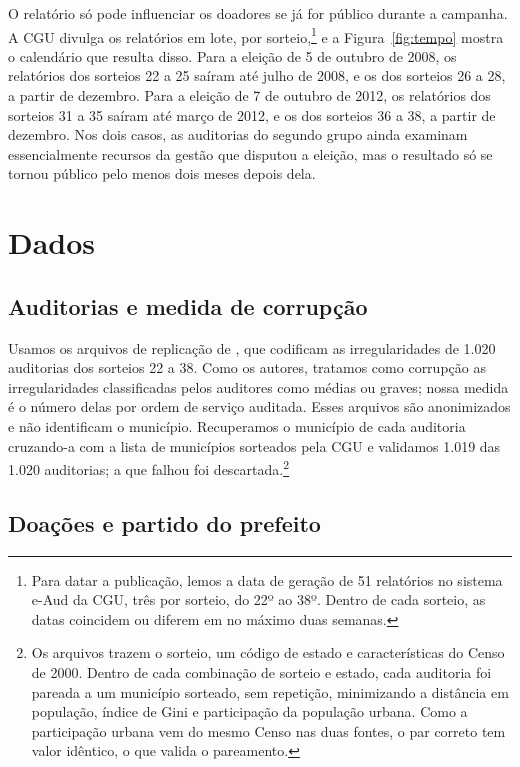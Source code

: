 O relatório só pode influenciar os doadores se já for público durante a campanha. A CGU divulga os
relatórios em lote, por sorteio,\footnote{Para datar a publicação, lemos a data de geração de 51 relatórios
no sistema e-Aud da CGU, três por sorteio, do 22º ao 38º. Dentro de cada sorteio, as datas coincidem ou
diferem em no máximo duas semanas.} e a Figura~\ref{fig:tempo} mostra o calendário que resulta disso. Para a eleição de 5 de outubro de
2008, os relatórios dos sorteios 22 a 25 saíram até julho de 2008, e os dos sorteios 26 a 28, a partir de
dezembro. Para a eleição de 7 de outubro de 2012, os relatórios dos sorteios 31 a 35 saíram até março de
2012, e os dos sorteios 36 a 38, a partir de dezembro. Nos dois casos, as auditorias do segundo grupo
ainda examinam essencialmente recursos da gestão que disputou a eleição, mas o resultado só se tornou
público pelo menos dois meses depois dela.


\FloatBarrier
\section{Dados}\label{sec:dados}

\subsection{Auditorias e medida de corrupção}

Usamos os arquivos de replicação de , que codificam as irregularidades de 1.020
auditorias dos sorteios 22 a 38. Como os autores, tratamos como corrupção as irregularidades classificadas
pelos auditores como médias ou graves; nossa medida é o número delas por ordem de serviço auditada. Esses
arquivos são anonimizados e não identificam o município. Recuperamos o município de cada auditoria
cruzando-a com a lista de municípios sorteados pela CGU e validamos 1.019 das 1.020 auditorias; a que
falhou foi descartada.\footnote{Os arquivos trazem o sorteio, um código de estado e características do
Censo de 2000. Dentro de cada combinação de sorteio e estado, cada auditoria foi pareada a um município
sorteado, sem repetição, minimizando a distância em população, índice de Gini e participação da população
urbana. Como a participação urbana vem do mesmo Censo nas duas fontes, o par correto tem valor idêntico, o
que valida o pareamento.}

\subsection{Doações e partido do prefeito}

